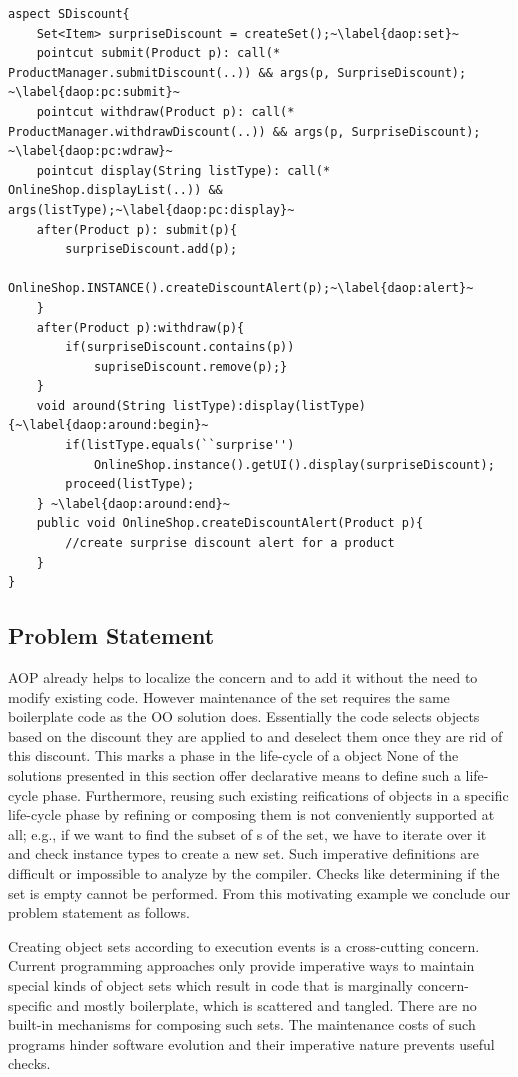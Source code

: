 \begin{lstlisting}[float=h, caption={An AspectJ implementation of discount alert concern}, label={lst:discountaop}]
aspect SDiscount{
	Set<Item> surpriseDiscount = createSet();~\label{daop:set}~
	pointcut submit(Product p): call(* ProductManager.submitDiscount(..)) && args(p, SurpriseDiscount); ~\label{daop:pc:submit}~
	pointcut withdraw(Product p): call(* ProductManager.withdrawDiscount(..)) && args(p, SurpriseDiscount); ~\label{daop:pc:wdraw}~
	pointcut display(String listType): call(* OnlineShop.displayList(..)) && args(listType);~\label{daop:pc:display}~
	after(Product p): submit(p){
		surpriseDiscount.add(p);
		OnlineShop.INSTANCE().createDiscountAlert(p);~\label{daop:alert}~
	}
	after(Product p):withdraw(p){
		if(surpriseDiscount.contains(p))
			supriseDiscount.remove(p);}
	}
	void around(String listType):display(listType){~\label{daop:around:begin}~
		if(listType.equals(``surprise'')
			OnlineShop.instance().getUI().display(surpriseDiscount);
		proceed(listType);	
	} ~\label{daop:around:end}~
	public void OnlineShop.createDiscountAlert(Product p){
		//create surprise discount alert for a product
	}
}
\end{lstlisting}

\subsection{Problem Statement}

AOP already helps to localize the concern and to add it without the need to modify existing code.
However maintenance of the  set requires the same boilerplate code as the OO solution does.
Essentially the code selects  objects based on the discount they are applied to and deselect them once they are rid of this discount. 
This marks a phase in the life-cycle of a  object None of the solutions presented in this section offer declarative means to define such a life-cycle phase.
Furthermore, reusing such existing reifications of objects in a specific life-cycle phase  by refining or composing them is not conveniently supported at all; e.g., if we want to find the subset of s of the  set, we have to iterate over it and check instance types to create a new set. Such imperative definitions are difficult or impossible to analyze by the compiler. Checks like determining if the set is empty cannot be performed. From this motivating example we conclude our problem statement as follows.

Creating object sets according to execution events is a cross-cutting concern. Current programming approaches only provide imperative ways to maintain special kinds of object sets which result in code that is marginally concern-specific and mostly boilerplate, which is scattered and tangled. There are no built-in mechanisms for composing such sets. The maintenance costs of such programs hinder software evolution and their imperative nature prevents useful checks.


